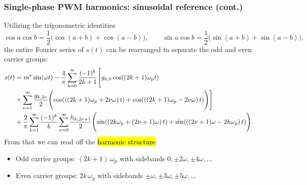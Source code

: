\begin{frame}
    \frametitle{Single-phase PWM harmonics: sinusoidal reference (cont.)}
    Utilizing the trigonometric identities
    \[
        \cos a\cos b=\frac{1}{2}\bigl(\cos(a+b)+\cos(a-b)\bigr),
        \qquad
        \sin a\cos b=\frac{1}{2}\bigl(\sin(a+b)+\sin(a-b)\bigr),
    \]
    the entire Fourier series of $s(t)$ can be rearranged to separate the odd and even carrier groups:
    \begin{align}
        s(t) & =  m^*\sin(\omega t)
        -\frac{4}{\pi}\sum_{k=0}^{\infty}\frac{(-1)^k}{2k+1}
        \Biggl[g_{k,0}\cos\!\left((2k+1)\omega_\mathrm{p}t\right) \notag                                                                             \\
            & +\sum_{\nu=1}^{\infty}\frac{g_{k,2\nu}}{2}
            \Biggl(\cos\!\left(\left((2k+1)\omega_\mathrm{p}+2\nu\omega\right)t\right)
            +\cos\!\left(\left((2k+1)\omega_\mathrm{p}-2\nu\omega\right)t\right)\Biggr)\Biggr] \label{eq:Fourier_series_single_phase_PWM_sinusoidal_ref} \\
             & +\frac{2}{\pi}\sum_{k=1}^{\infty}\frac{(-1)^k}{k}
        \sum_{\nu=0}^{\infty}\frac{h_{k,2\nu+1}}{2}
        \Biggl(\sin\!\left(\left(2k\omega_\mathrm{p}+(2\nu+1)\omega\right)t\right)
        +\sin\!\left(\left((2\nu+1)\omega-2k\omega_\mathrm{p}\right)t\right)\Biggr). \notag
    \end{align}
    From that we can read off the \hl{harmonic structure}:
    \begin{itemize}
        \item Odd carrier groups: $\left(2k+1\right)\,\omega_\mathrm{p}$ with sidebands $0,\pm 2\omega,\pm 4\omega,\ldots$
        \item Even carrier groups: $2k\,\omega_\mathrm{p}$ with sidebands $\pm \omega,\pm 3\omega,\pm 5\omega,\ldots$
    \end{itemize}
\end{frame}

